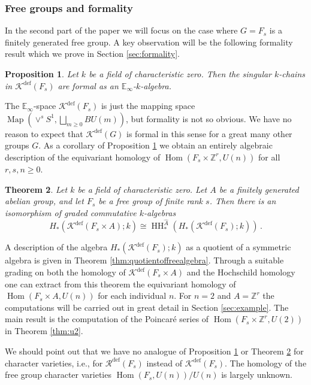 \documentclass[oneside, a4paper, 12pt]{article}
\numberwithin{equation}{section}
\DeclareMathOperator{\Hom}{Hom}
\DeclareMathOperator{\HH}{HH}
\newcommand{\Kdef}{\mathcal{K}^{\mathrm{def}}}
\newcommand{\Rdef}{\mathcal{R}^{\mathrm{def}}}
\newcommand{\Z}{\mathbb{Z}}
\newcommand{\Map}{\operatorname{Map}}
\theoremstyle{plain}
\newtheorem{theorem}{Theorem}[section]
\newtheorem{proposition}[theorem]{Proposition}
\theoremstyle{definition}
\theoremstyle{remark}
\begin{document}
\subsubsection*{Free groups and formality}

In the second part of the paper we will focus on the case where $G=F_s$ is a finitely generated free group. A key observation will be the following formality result which we prove in Section \ref{sec:formality}. 

\begin{proposition} \label{prop:formalityintro}
Let $k$ be a field of characteristic zero. Then the singular $k$-chains in $\Kdef(F_s)$ are formal as an $\mathbb{E}_\infty$-$k$-algebra.
\end{proposition}

The $\mathbb{E}_\infty$-space $\Kdef(F_s)$ is just the mapping space $\Map(\vee^s S^1,\bigsqcup_{m\geq 0} BU(m))$, but formality is not so obvious. We have no reason to expect that $\Kdef(G)$ is formal in this sense for a great many other groups $G$.  As a corollary of Proposition \ref{prop:formalityintro} we obtain an entirely algebraic description of the equivariant homology of $\Hom(F_s\times \Z^r,U(n))$ for all $r,s,n\geq 0$.

\begin{theorem} \label{thm:hhintro}
Let $k$ be a field of characteristic zero. Let $A$ be a finitely generated abelian group, and let $F_s$ be a free group of finite rank $s$. Then there is an isomorphism of graded commutative $k$-algebras
\[
H_\ast(\Kdef(F_s\times A);k)\cong \HH^{\widehat{A}}_\ast(H_\ast(\Kdef(F_s);k))\, .
\]
\end{theorem}
A description of the algebra $H_\ast(\Kdef(F_s);k)$ as a quotient of a symmetric algebra is given in Theorem \ref{thm:quotientoffreealgebra}. Through a suitable grading on both the homology of $\Kdef(F_s\times A)$ and the Hochschild homology one can extract from this theorem the equivariant homology of $\Hom(F_s\times A,U(n))$ for each individual $n$. For $n=2$ and $A=\Z^r$ the computations will be carried out in great detail in Section \ref{sec:example}. The main result is the computation of the Poincar{\'e} series of $\Hom(F_s\times \Z^r,U(2))$ in Theorem \ref{thm:u2}.

We should point out that we have no analogue of Proposition \ref{prop:formalityintro} or Theorem \ref{thm:hhintro} for character varieties, i.e., for $\Rdef(F_s)$ instead of $\Kdef(F_s)$. The homology of the free group character varieties $\Hom(F_s,U(n))/U(n)$ is largely unknown.
\end{document}

